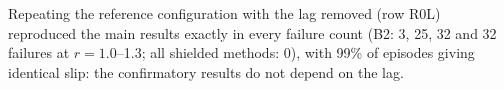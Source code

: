 Repeating the reference configuration with the lag removed (row R0L) reproduced the main results exactly in every failure
count (B2: 3, 25, 32 and 32 failures at $r=1.0$--1.3; all shielded methods: 0), with 99\% of episodes giving identical slip:
the confirmatory results do not depend on the lag.
